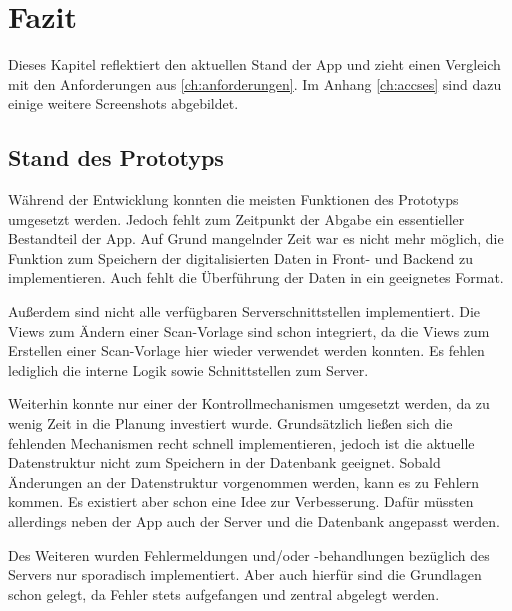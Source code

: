 \documentclass[notables, nomenclature, oneside, 150]{HSMW-Thesis}
\begin{document}

\chapter{Fazit}\label{ch:fazit}
	Dieses Kapitel reflektiert den aktuellen Stand der App und zieht einen Vergleich mit den Anforderungen aus \autoref{ch:anforderungen}. Im Anhang \autoref{ch:accses} sind dazu einige weitere Screenshots abgebildet.
	
	\section{Stand des Prototyps}
		Während der Entwicklung konnten die meisten Funktionen des Prototyps umgesetzt werden. Jedoch fehlt zum Zeitpunkt der Abgabe ein essentieller Bestandteil der App. Auf Grund mangelnder Zeit war es nicht mehr möglich, die Funktion zum Speichern der digitalisierten Daten in Front- und Backend zu implementieren. Auch fehlt die Überführung der Daten in ein geeignetes Format.
		
		Außerdem sind nicht alle verfügbaren Serverschnittstellen implementiert. Die Views zum Ändern einer Scan-Vorlage sind schon integriert, da die Views zum Erstellen einer Scan-Vorlage hier wieder verwendet werden konnten. Es fehlen lediglich die interne Logik sowie Schnittstellen zum Server.	
		
		Weiterhin konnte nur einer der Kontrollmechanismen umgesetzt werden, da zu wenig Zeit in die Planung investiert wurde. Grundsätzlich ließen sich die fehlenden Mechanismen recht schnell implementieren, jedoch ist die aktuelle Datenstruktur nicht zum Speichern in der Datenbank geeignet. Sobald Änderungen an der Datenstruktur vorgenommen werden, kann es zu Fehlern kommen. Es existiert aber schon eine Idee zur Verbesserung. Dafür müssten allerdings neben der App auch der Server und die Datenbank angepasst werden. 
		
		Des Weiteren wurden Fehlermeldungen und/oder -behandlungen bezüglich des Servers nur sporadisch implementiert. Aber auch hierfür sind die Grundlagen schon gelegt, da Fehler stets aufgefangen und zentral abgelegt werden. 
	
%	
%	
%	
%	
%	
%	
\end{document}
